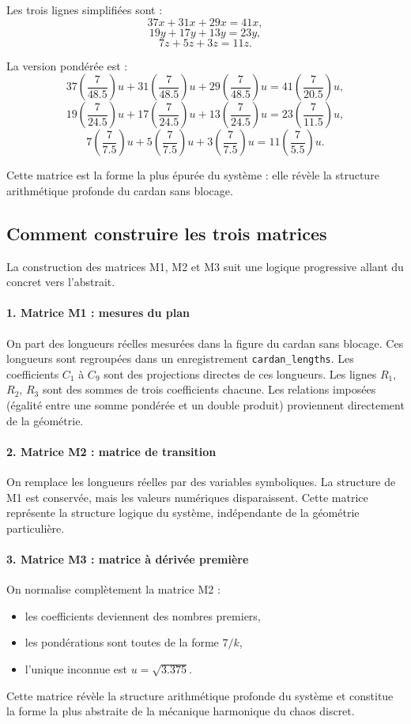 \documentclass[12pt,a4paper]{article}
\theoremstyle{definition}
\theoremstyle{remark}
\begin{document}
Les trois lignes simplifiées sont :
\[
  37x + 31x + 29x = 41x,
\]
\[
  19y + 17y + 13y = 23y,
\]
\[
   7z +  5z +  3z = 11z.
\]

La version pondérée est :
\[
  37\left(\frac{7}{48.5}\right)u
  + 31\left(\frac{7}{48.5}\right)u
  + 29\left(\frac{7}{48.5}\right)u
  = 41\left(\frac{7}{20.5}\right)u,
\]
\[
  19\left(\frac{7}{24.5}\right)u
  + 17\left(\frac{7}{24.5}\right)u
  + 13\left(\frac{7}{24.5}\right)u
  = 23\left(\frac{7}{11.5}\right)u,
\]
\[
   7\left(\frac{7}{7.5}\right)u
  +  5\left(\frac{7}{7.5}\right)u
  +  3\left(\frac{7}{7.5}\right)u
  = 11\left(\frac{7}{5.5}\right)u.
\]

Cette matrice est la forme la plus épurée du système : elle révèle la structure
arithmétique profonde du cardan sans blocage.

\subsection{Comment construire les trois matrices}

La construction des matrices M1, M2 et M3 suit une logique progressive allant
du concret vers l’abstrait.

\paragraph{1. Matrice M1 : mesures du plan}
On part des longueurs réelles mesurées dans la figure du cardan sans blocage.
Ces longueurs sont regroupées dans un enregistrement \texttt{cardan\_lengths}.
Les coefficients \(C_1\) à \(C_9\) sont des projections directes de ces longueurs.
Les lignes \(R_1\), \(R_2\), \(R_3\) sont des sommes de trois coefficients chacune.
Les relations imposées (égalité entre une somme pondérée et un double produit)
proviennent directement de la géométrie.

\paragraph{2. Matrice M2 : matrice de transition}
On remplace les longueurs réelles par des variables symboliques.
La structure de M1 est conservée, mais les valeurs numériques disparaissent.
Cette matrice représente la structure logique du système, indépendante de la
géométrie particulière.

\paragraph{3. Matrice M3 : matrice à dérivée première}
On normalise complètement la matrice M2 :
\begin{itemize}
  \item les coefficients deviennent des nombres premiers,
  \item les pondérations sont toutes de la forme \(7/k\),
  \item l’unique inconnue est \(u = \sqrt{3.375}\).
\end{itemize}
Cette matrice révèle la structure arithmétique profonde du système et constitue
la forme la plus abstraite de la mécanique harmonique du chaos discret.
\end{document}

